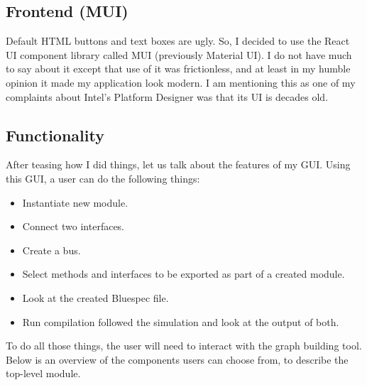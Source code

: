 \documentclass[12pt]{report}
\begin{document}
\subsection{Frontend (MUI)}

Default HTML buttons and text boxes are ugly. So, I decided to use the React UI component library called MUI (previously Material UI). I do not have much to say about it except that use of it was frictionless, and at least in my humble opinion it made my application look modern. I am mentioning this as one of my complaints about Intel's Platform Designer was that its UI is decades old.
 
\subsection{Functionality} 
After teasing how I did things, let us talk about the features of my GUI.  
Using this GUI, a user can do the following things:  
\begin{itemize} 
   \item Instantiate new module.  
   \item Connect two interfaces. 
   \item Create a bus. 
   \item Select methods and interfaces to be exported as part of a created module. 
   \item Look at the created Bluespec file. 
   \item Run compilation followed the simulation and look at the output of both.  
\end{itemize} 
To do all those things, the user will need to interact with the graph building tool. Below is an overview of the components users can choose from, to describe the top-level module. 
\end{document}
